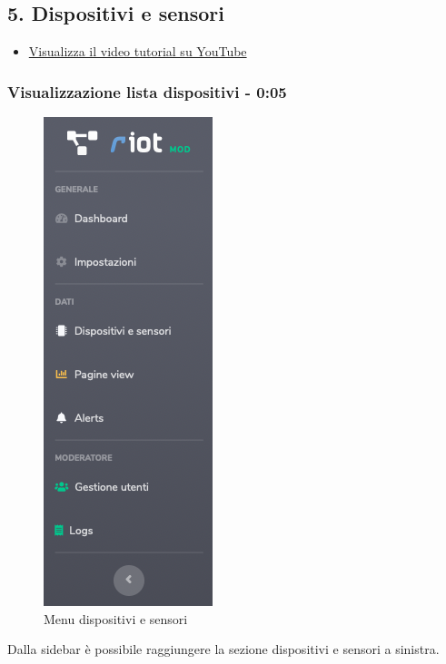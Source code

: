 \newpage \subsection{5. Dispositivi e sensori}
	
	\begin{itemize}
		\item \href{https://www.youtube.com/watch?v=PjySMOLCtMA&list=PLPKYjnuIh1FA3b3jn_bwY_ztYzaFn2mIT&index=8}{Visualizza il video tutorial su YouTube} 
	\end{itemize}

	\subsubsection{Visualizzazione lista dispositivi - 0:05}
		\begin{figure}[H]
		\centering
		\includegraphics[scale=0.600]{res/images/membro/menuDisp.png}
		\caption{Menu dispositivi e sensori}
		\end{figure}
		Dalla sidebar è possibile raggiungere la sezione dispositivi e sensori a sinistra. 
